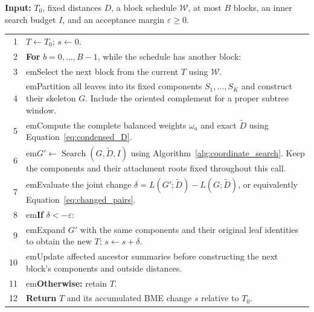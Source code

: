 \documentclass[11pt,a4paper]{article}
\makeatletter
\newcommand{\algindent}[1]{\hangindent=#1em\hangafter=1\hspace*{#1em}}
\DeclareRobustCommand{\_}{\ifmmode\nfss@text{\textunderscore}\else\textunderscore\allowbreak\fi}
\theoremstyle{definition}
\makeatother
\begin{document}
\begin{algorithm}[!htbp]
\caption{Exact full-tree or minibatch optimisation}
\label{alg:block_search}
\small
\textbf{Input:} $T_0$, fixed distances $D$, a block schedule $\mathcal W$, at most $B$ blocks, an inner search budget $I$, and an acceptance margin $\varepsilon\geq0$.\par\smallskip
\begin{tabular}{@{}r@{\quad}>{\raggedright\arraybackslash}p{.93\linewidth}@{}}
1 & $T\gets T_0$; $s\gets0$.\\
2 & \textbf{For} $b=0,\ldots,B-1$, while the schedule has another block:\\
3 & \algindent{1}Select the next block from the current $T$ using $\mathcal W$.\\
4 & \algindent{1}Partition all leaves into its fixed components $S_1,\ldots,S_K$ and construct their skeleton $G$. Include the oriented complement for a proper subtree window.\\
5 & \algindent{1}Compute the complete balanced weights $\omega_a$ and exact $\widetilde D$ using Equation~\eqref{eq:condensed_D}.\\
6 & \algindent{1}$G'\gets\operatorname{Search}(G,\widetilde D,I)$ using Algorithm~\ref{alg:coordinate_search}. Keep the components and their attachment roots fixed throughout this call.\\
7 & \algindent{1}Evaluate the joint change $\delta=L(G';\widetilde D)-L(G;\widetilde D)$, or equivalently Equation~\eqref{eq:changed_pairs}.\\
8 & \algindent{1}\textbf{If} $\delta<-\varepsilon$:\\
9 & \algindent{2}Expand $G'$ with the same components and their original leaf identities to obtain the new $T$; $s\gets s+\delta$.\\
10 & \algindent{2}Update affected ancestor summaries before constructing the next block's components and outside distances.\\
11 & \algindent{1}\textbf{Otherwise:} retain $T$.\\
12 & \textbf{Return} $T$ and its accumulated BME change $s$ relative to $T_0$.\\
\end{tabular}
\end{algorithm}
\end{document}
